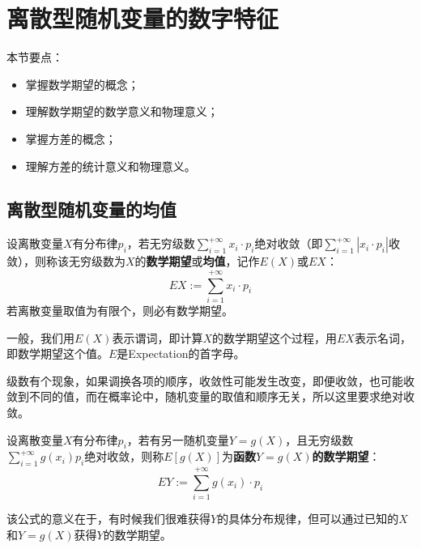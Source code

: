 \section{离散型随机变量的数字特征}

本节要点：
\begin{itemize}
    \item 掌握数学期望的概念；
    \item 理解数学期望的数学意义和物理意义；
    \item 掌握方差的概念；
    \item 理解方差的统计意义和物理意义。
\end{itemize}

\subsection{离散型随机变量的均值}

\begin{definition}[数学期望]
设离散变量$X$有分布律$p_i$，若无穷级数$\sum_{i=1}^{+\infty}{x_i\cdot p_i}$绝对收敛（即$\sum_{i=1}^{+\infty}{\left| x_i\cdot p_i \right|}$收敛），则称该无穷级数为$X$的{\bf 数学期望}或{\bf 均值}，记作$E\left( X \right) $或$EX$：
\[
EX:=\sum_{i=1}^{+\infty}{x_i\cdot p_i}
\]
若离散变量取值为有限个，则必有数学期望。
\end{definition}

一般，我们用$E\left( X \right) $表示谓词，即计算$X$的数学期望这个过程，用$EX$表示名词，即数学期望这个值。$E$是Expectation的首字母。

\begin{tcolorbox}
级数有个现象，如果调换各项的顺序，收敛性可能发生改变，即便收敛，也可能收敛到不同的值，而在概率论中，随机变量的取值和顺序无关，所以这里要求绝对收敛。
\end{tcolorbox}


\begin{definition}[随机变量函数的数学期望]
设离散变量$X$有分布律$p_i$，若有另一随机变量$Y=g\left( X \right) $，且无穷级数$\sum_{i=1}^{+\infty}{g\left( x_i \right) p_i}$绝对收敛，则称$E\left[ g\left( X \right) \right] $为{\bf 函数$Y=g\left( X \right) $的数学期望}：
\[
EY:=\sum_{i=1}^{+\infty}{g\left( x_i \right) \cdot p_i}
\]
\end{definition}

该公式的意义在于，有时候我们很难获得$Y$的具体分布规律，但可以通过已知的$X$和$Y=g\left( X \right) $获得$Y$的数学期望。

